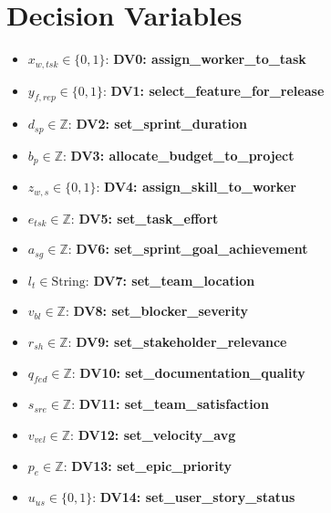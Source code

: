 \documentclass{article}
\begin{document}
\section{Decision Variables}
\begin{itemize}
    \item $x_{w,tsk} \in \{0,1\}$: \textbf{DV0: assign\_worker\_to\_task}
    \item $y_{f,rep} \in \{0,1\}$: \textbf{DV1: select\_feature\_for\_release}
    \item $d_{sp} \in \mathbb{Z}$: \textbf{DV2: set\_sprint\_duration}
    \item $b_p \in \mathbb{Z}$: \textbf{DV3: allocate\_budget\_to\_project}
    \item $z_{w,s} \in \{0,1\}$: \textbf{DV4: assign\_skill\_to\_worker}
    \item $e_{tsk} \in \mathbb{Z}$: \textbf{DV5: set\_task\_effort}
    \item $a_{sg} \in \mathbb{Z}$: \textbf{DV6: set\_sprint\_goal\_achievement}
    \item $l_t \in \text{String}$: \textbf{DV7: set\_team\_location}
    \item $v_{bl} \in \mathbb{Z}$: \textbf{DV8: set\_blocker\_severity}
    \item $r_{sh} \in \mathbb{Z}$: \textbf{DV9: set\_stakeholder\_relevance}
    \item $q_{fed} \in \mathbb{Z}$: \textbf{DV10: set\_documentation\_quality}
    \item $s_{sre} \in \mathbb{Z}$: \textbf{DV11: set\_team\_satisfaction}
    \item $v_{vel} \in \mathbb{Z}$: \textbf{DV12: set\_velocity\_avg}
    \item $p_e \in \mathbb{Z}$: \textbf{DV13: set\_epic\_priority}
    \item $u_{us} \in \{0,1\}$: \textbf{DV14: set\_user\_story\_status}
\end{itemize}
\end{document}
